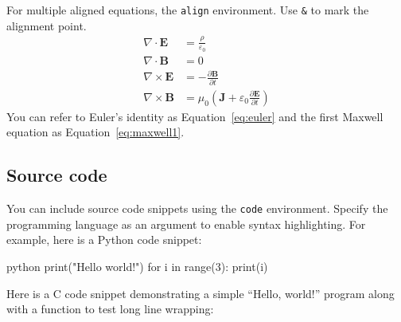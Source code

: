 For multiple aligned equations, the \texttt{align} environment. Use \texttt{\&} to mark the alignment point.
\begin{align}
  \label{eq:maxwell1}
  \nabla \cdot \mathbf{E} &= \frac{\rho}{\varepsilon_0} \\
  \label{eq:maxwell2}
  \nabla \cdot \mathbf{B} &= 0 \\
  \label{eq:maxwell3}
  \nabla \times \mathbf{E} &= -\frac{\partial \mathbf{B}}{\partial t} \\
  \label{eq:maxwell4}
  \nabla \times \mathbf{B} &= \mu_0 \left( \mathbf{J} + \varepsilon_0 \frac{\partial \mathbf{E}}{\partial t} \right)
\end{align}
You can refer to Euler's identity as Equation~\ref{eq:euler} and the first Maxwell equation as Equation~\ref{eq:maxwell1}.
\subsection{Source code}
You can include source code snippets using the \texttt{code} environment. Specify the programming language as an argument to enable syntax highlighting. For example, here is a Python code snippet:
\begin{code}{python}
  print("Hello world!")
  for i in range(3):
  print(i)
\end{code}

Here is a C code snippet demonstrating a simple ``Hello, world!'' program along with a function to test long line wrapping:

